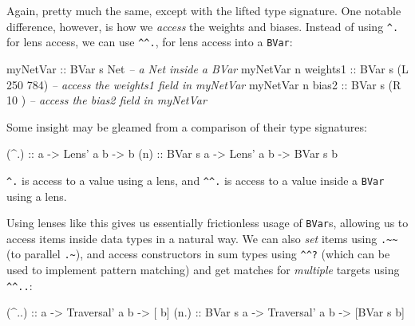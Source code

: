 \documentclass[]{article}
\newenvironment{Shaded}{}{}
\newcommand{\CommentTok}[1]{\textcolor[rgb]{0.38,0.63,0.69}{\textit{#1}}}
\newcommand{\DataTypeTok}[1]{\textcolor[rgb]{0.56,0.13,0.00}{#1}}
\newcommand{\DecValTok}[1]{\textcolor[rgb]{0.25,0.63,0.44}{#1}}
\newcommand{\FunctionTok}[1]{\textcolor[rgb]{0.02,0.16,0.49}{#1}}
\newcommand{\NormalTok}[1]{#1}
\newcommand{\OtherTok}[1]{\textcolor[rgb]{0.00,0.44,0.13}{#1}}
\begin{document}
Again, pretty much the same, except with the lifted type signature. One notable
difference, however, is how we \emph{access} the weights and biases. Instead of
using \texttt{\^{}.} for lens access, we can use \texttt{\^{}\^{}.}, for lens
access into a \texttt{BVar}:

\begin{Shaded}
\begin{Highlighting}[]
\OtherTok{myNetVar                ::} \DataTypeTok{BVar}\NormalTok{ s }\DataTypeTok{Net}          \CommentTok{-- a Net inside a BVar}
\NormalTok{myNetVar }\FunctionTok{^^.}\OtherTok{ weights1   ::} \DataTypeTok{BVar}\NormalTok{ s (}\DataTypeTok{L} \DecValTok{250} \DecValTok{784}\NormalTok{)  }\CommentTok{-- access the weights1 field in myNetVar}
\NormalTok{myNetVar }\FunctionTok{^^.}\OtherTok{ bias2      ::} \DataTypeTok{BVar}\NormalTok{ s (}\DataTypeTok{R}  \DecValTok{10}\NormalTok{    )  }\CommentTok{-- access the bias2 field in myNetVar}
\end{Highlighting}
\end{Shaded}

Some insight may be gleamed from a comparison of their type signatures:

\begin{Shaded}
\begin{Highlighting}[]
\OtherTok{(^.)  ::}\NormalTok{        a }\OtherTok{->} \DataTypeTok{Lens'}\NormalTok{ a b }\OtherTok{->}\NormalTok{        b}
\OtherTok{(^^.) ::} \DataTypeTok{BVar}\NormalTok{ s a }\OtherTok{->} \DataTypeTok{Lens'}\NormalTok{ a b }\OtherTok{->} \DataTypeTok{BVar}\NormalTok{ s b}
\end{Highlighting}
\end{Shaded}

\texttt{\^{}.} is access to a value using a lens, and \texttt{\^{}\^{}.} is
access to a value inside a \texttt{BVar} using a lens.

Using lenses like this gives us essentially frictionless usage of
\texttt{BVar}s, allowing us to access items inside data types in a natural way.
We can also \emph{set} items using \texttt{.\textasciitilde{}\textasciitilde{}}
(to parallel \texttt{.\textasciitilde{}}), and access constructors in sum types
using \texttt{\^{}\^{}?} (which can be used to implement pattern matching) and
get matches for \emph{multiple} targets using \texttt{\^{}\^{}..}:

\begin{Shaded}
\begin{Highlighting}[]
\OtherTok{(^..)  ::}\NormalTok{        a }\OtherTok{->} \DataTypeTok{Traversal'}\NormalTok{ a b }\OtherTok{->}\NormalTok{ [       b]}
\OtherTok{(^^..) ::} \DataTypeTok{BVar}\NormalTok{ s a }\OtherTok{->} \DataTypeTok{Traversal'}\NormalTok{ a b }\OtherTok{->}\NormalTok{ [}\DataTypeTok{BVar}\NormalTok{ s b]}
\end{Highlighting}
\end{Shaded}
\end{document}
